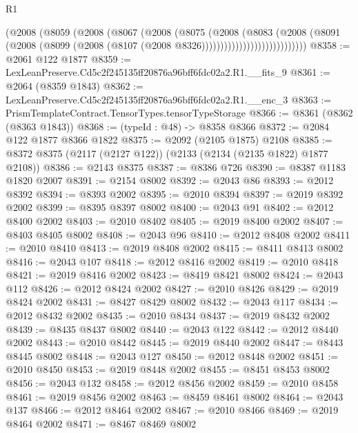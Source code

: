 \begin{lexlean}{R1}
\begin{coremodule}
                              (@2008
                                (@8059
                                  (@2008
                                    (@8067
                                      (@2008
                                        (@8075
                                          (@2008
                                            (@8083
                                              (@2008
                                                (@8091
                                                  (@2008
                                                    (@8099
                                                      (@2008
                                                        (@8107
                                                          (@2008 @8326))))))))))))))))))))))))))))
@8358 := @2061 @122 @1877
@8359 := LexLeanPreserve.Cd5c2f245135ff20876a96bff6fdc02a2.R1.__fits_9
@8361 := @2064 (@8359 @1843)
@8362 := LexLeanPreserve.Cd5c2f245135ff20876a96bff6fdc02a2.R1.__enc_3
@8363 := PrismTemplateContract.TensorTypes.tensorTypeStorage
@8366 := @8361 (@8362 (@8363 @1843))
@8368 := (typeId : @48) -> @8358 @8366
@8372 := @2084 @122 @1877 @8366 @1822
@8375 := @2092 (@2105 @1875) @2108
@8385 := @8372 @8375 (@2117 (@2127 @122)) (@2133 (@2134 (@2135 @1822) @1877 @2108))
@8386 := @2143 @8375
@8387 := @8386 @726
@8390 := @8387 @1183 @1820 @2007
@8391 := @2154 @8002
@8392 := @2043 @86
@8393 := @2012 @8392
@8394 := @8393 @2002
@8395 := @2010 @8394
@8397 := @2019 @8392 @2002
@8399 := @8395 @8397 @8002
@8400 := @2043 @91
@8402 := @2012 @8400 @2002
@8403 := @2010 @8402
@8405 := @2019 @8400 @2002
@8407 := @8403 @8405 @8002
@8408 := @2043 @96
@8410 := @2012 @8408 @2002
@8411 := @2010 @8410
@8413 := @2019 @8408 @2002
@8415 := @8411 @8413 @8002
@8416 := @2043 @107
@8418 := @2012 @8416 @2002
@8419 := @2010 @8418
@8421 := @2019 @8416 @2002
@8423 := @8419 @8421 @8002
@8424 := @2043 @112
@8426 := @2012 @8424 @2002
@8427 := @2010 @8426
@8429 := @2019 @8424 @2002
@8431 := @8427 @8429 @8002
@8432 := @2043 @117
@8434 := @2012 @8432 @2002
@8435 := @2010 @8434
@8437 := @2019 @8432 @2002
@8439 := @8435 @8437 @8002
@8440 := @2043 @122
@8442 := @2012 @8440 @2002
@8443 := @2010 @8442
@8445 := @2019 @8440 @2002
@8447 := @8443 @8445 @8002
@8448 := @2043 @127
@8450 := @2012 @8448 @2002
@8451 := @2010 @8450
@8453 := @2019 @8448 @2002
@8455 := @8451 @8453 @8002
@8456 := @2043 @132
@8458 := @2012 @8456 @2002
@8459 := @2010 @8458
@8461 := @2019 @8456 @2002
@8463 := @8459 @8461 @8002
@8464 := @2043 @137
@8466 := @2012 @8464 @2002
@8467 := @2010 @8466
@8469 := @2019 @8464 @2002
@8471 := @8467 @8469 @8002

\end{coremodule}
\end{lexlean}

